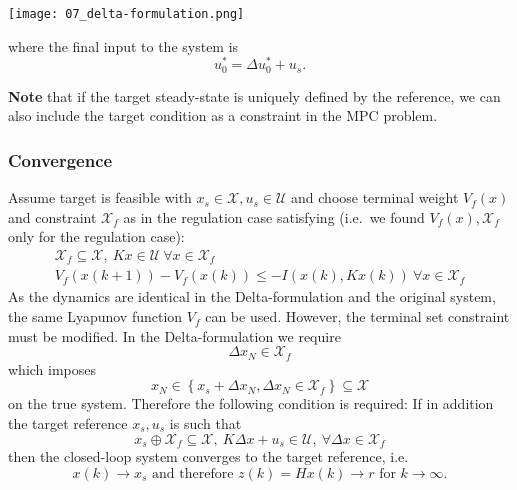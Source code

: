 \begin{center}
    \texttt{[image: 07\_delta-formulation.png]}
\end{center}

where the final input to the system is
\begin{equation*}
    u_0^* = \Delta u_0^* + u_s.
\end{equation*}

\textbf{Note} that if the target steady-state is uniquely defined by the reference, we can also include the target condition as a constraint in the MPC problem.

\subsubsection{Convergence}

Assume target is feasible with $x_s \in \mathcal{X}, u_s \in \mathcal{U}$ and choose terminal weight $V_f(x)$ and constraint $\mathcal{X}_f$ as in the regulation case satisfying (i.e.\ we found $V_f(x), \mathcal{X}_f$ only for the regulation case):
\begin{gather*}
    \mathcal{X}_f \subseteq \mathcal{X}, \: Kx \in \mathcal{U} \: \forall x \in \mathcal{X}_f \\
    V_f(x(k+1)) - V_f(x(k)) \leq -I(x(k),Kx(k)) \: \forall x \in \mathcal{X}_f
\end{gather*}
\newpar{}
As the dynamics are identical in the Delta-formulation and the original system, the same Lyapunov function $V_f$ can be used.
\newpar{}
However, the terminal set constraint must be modified. In the Delta-formulation we require
\begin{equation*}
    \Delta x_N \in \mathcal{X}_f
\end{equation*}
which imposes
\begin{equation*}
    x_N \in \left\{x_s + \Delta x_N, \Delta x_N \in \mathcal{X}_f\right\} \subseteq \mathcal{X}
\end{equation*}
on the true system. Therefore the following condition is required: If in addition the target reference $x_s, u_s$ is such that
\begin{equation*}
    x_s \oplus \mathcal{X}_f \subseteq \mathcal{X}, \: K\Delta x + u_s \in \mathcal{U}, \: \forall \Delta x \in \mathcal{X}_f
\end{equation*}
then the closed-loop system converges to the target reference, i.e.
\begin{equation*}
    x(k) \to x_s \text{ and therefore } z(k) = Hx(k) \to r \text{ for } k \to \infty.
\end{equation*}


